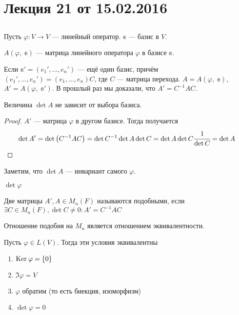 


\renewcommand{\phi}{\varphi}

\section{Лекция 21 от 15.02.2016}
\subsection*{}
Пусть $\phi\colon V \rightarrow V$ --- линейный оператор. $\mathbb{e}$ --- базис в $V$. 
\begin{Designation}
    $A(\phi,\;\mathbb{e})$ --- матрица линейного оператора $\phi$ в базисе $\mathbb{e}$.
\end{Designation}
Если $\mathbb{e}' = (e_1', \ldots, e_n')$ --- ещё один базис, причём $(e_1', \ldots, e_n') = (e_1, \ldots, e_n)C$, где $C$ --- матрица перехода. $A = A(\phi,\; \mathbb{e})$, $A' = A(\phi,\; \mathbb{e}')$.
В прошлый раз мы доказали, что $A' = C^{-1}AC$.
\begin{Consequence}
    Величина $\det A$ не зависит от выбора базиса. 
\end{Consequence}
\begin{proof}
    $A'$ --- матрица $\phi$ в другом базисе. Тогда получается
    \begin{gather*}
        \det A' = \det \left(C^{-1}AC\right) = \det C^{-1} \det A \det C = \det A \det C \cfrac{1}{\det C} = \det A
    \end{gather*}
\end{proof}
Заметим, что $\det A$ --- инвариант самого $\phi$. 
\begin{Designation}
    $\det\phi$
\end{Designation}
\begin{Def}
    Две матрицы $A', A \in M_n(F)$ называются подобными, если $\exists C \in M_n(F), \det C \neq 0\colon A' = C^{-1}AC$
\end{Def}
\begin{Comment}
    Отношение подобия на $M_n$ является отношением эквивалентности. 
\end{Comment}
\begin{Suggestion}
    Пусть $\phi \in L(V)$. Тогда эти условия эквивалентны
    \begin{enumerate}
        \item $\Ker\phi = \{0\}$
        \item $\Im \phi = V$
        \item $\phi$ обратим (то есть биекция, изоморфизм)
        \item $\det \phi = 0$
    \end{enumerate}
\end{Suggestion}
